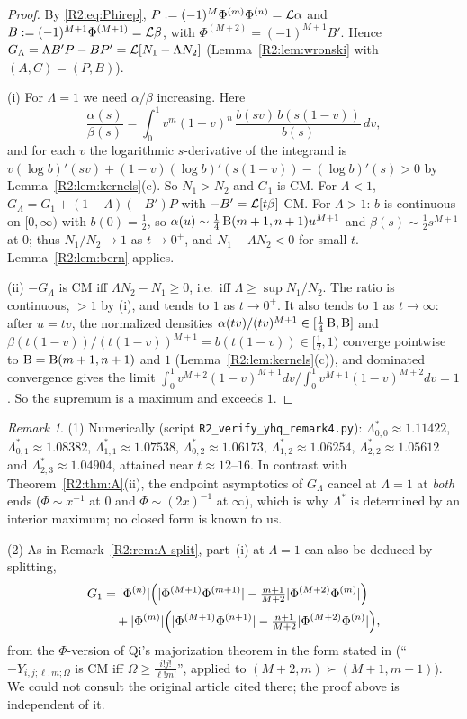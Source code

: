 \documentclass[11pt]{amsart}
\theoremstyle{definition}
\theoremstyle{remark}
\newtheorem{remark}[theorem]{Remark}
\begin{document}
\begin{proof}
By \eqref{R2:eq:Phirep}, $P:=(-1)^M\Phi^{(m)}\Phi^{(n)}=\mathcal{L}\alpha$ and
$B:=(-1)^{M+1}\Phi^{(M+1)}=\mathcal{L}\beta$, with $\Phi^{(M+2)}=(-1)^{M+1}B'$.
Hence $G_\Lambda=\Lambda B'P-BP'=\mathcal{L}[N_1-\Lambda N_2]$
(Lemma~\ref{R2:lem:wronski} with $(A,C)=(P,B)$).

(i) For $\Lambda=1$ we need $\alpha/\beta$ increasing. Here
\[
 \frac{\alpha(s)}{\beta(s)}=\int_0^1v^m(1-v)^n\,\frac{b(sv)\,b(s(1-v))}{b(s)}\,dv,
\]
and for each $v$ the logarithmic $s$-derivative of the integrand is
$v(\log b)'(sv)+(1-v)(\log b)'(s(1-v))-(\log b)'(s)>0$ by
Lemma~\ref{R2:lem:kernels}(c). So $N_1>N_2$ and $G_1$ is CM. For
$\Lambda<1$, $G_\Lambda=G_1+(1-\Lambda)(-B')P$ with $-B'=\mathcal{L}[t\beta]$ CM.
For $\Lambda>1$: $b$ is continuous on $[0,\infty)$ with $b(0)=\frac12$, so
$\alpha(u)\sim\frac14\operatorname{B}(m+1,n+1)u^{M+1}$ and $\beta(s)\sim\frac12s^{M+1}$
at $0$; thus $N_1/N_2\to1$ as $t\to0^+$, and $N_1-\Lambda N_2<0$ for small
$t$. Lemma~\ref{R2:lem:bern} applies.

(ii) $-G_\Lambda$ is CM iff $\Lambda N_2-N_1\ge0$, i.e.\ iff
$\Lambda\ge\sup N_1/N_2$. The ratio is continuous, $>1$ by (i), and tends to
$1$ as $t\to0^+$. It also tends to $1$ as $t\to\infty$: after $u=tv$, the
normalized densities $\alpha(tv)/(tv)^{M+1}\in[\frac14\operatorname{B},\operatorname{B}]$ and
$\beta(t(1-v))/(t(1-v))^{M+1}=b(t(1-v))\in[\frac12,1)$ converge pointwise to
$\operatorname{B}=\operatorname{B}(m+1,n+1)$ and $1$ (Lemma~\ref{R2:lem:kernels}(c)), and
dominated convergence gives the limit
$\int_0^1v^{M+2}(1-v)^{M+1}dv/\int_0^1v^{M+1}(1-v)^{M+2}dv=1$. So the
supremum is a maximum and exceeds $1$.
\end{proof}

\begin{remark}\label{R2:rem:C}
(1) Numerically (script \texttt{R2\_\allowbreak{}verify\_\allowbreak{}yhq\_\allowbreak{}remark4.py}):
$\Lambda^*_{0,0}\approx1.11422$, $\Lambda^*_{0,1}\approx1.08382$,
$\Lambda^*_{1,1}\approx1.07538$, $\Lambda^*_{0,2}\approx1.06173$,
$\Lambda^*_{1,2}\approx1.06254$, $\Lambda^*_{2,2}\approx1.05612$ and
$\Lambda^*_{2,3}\approx1.04904$, attained near $t\approx12$--$16$. In
contrast with Theorem~\ref{R2:thm:A}(ii), the endpoint asymptotics of
$G_\Lambda$ cancel at $\Lambda=1$ at \emph{both} ends ($\Phi\sim x^{-1}$ at
$0$ and $\Phi\sim(2x)^{-1}$ at $\infty$), which is why $\Lambda^*$ is
determined by an interior maximum; no closed form is known to us.

(2) As in Remark~\ref{R2:rem:A-split}, part~(i) at $\Lambda=1$ can also be
deduced by splitting,
\begin{align*}
 G_1&=|\Phi^{(n)}|\Bigl(|\Phi^{(M+1)}\Phi^{(m+1)}|-\tfrac{m+1}{M+2}|\Phi^{(M+2)}\Phi^{(m)}|\Bigr)\\
 &\quad+|\Phi^{(m)}|\Bigl(|\Phi^{(M+1)}\Phi^{(n+1)}|-\tfrac{n+1}{M+2}|\Phi^{(M+2)}\Phi^{(n)}|\Bigr),
\end{align*}
from the $\Phi$-version of Qi's majorization theorem in the form stated in
\cite[Thm.~17]{R2-QiAgarwal2024} (``$-Y_{i,j;\ell,m;\Omega}$ is CM iff
$\Omega\ge\frac{i!j!}{\ell!m!}$'', applied to $(M+2,m)\succ(M+1,m+1)$). We
could not consult the original article cited there; the proof above is
independent of it.
\end{remark}
\end{document}
